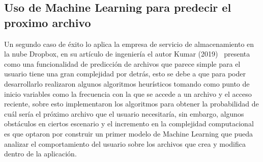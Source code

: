 \documentclass[9pt,a4paper,twoside]{rho-class/rho}
\begin{document}
        \subsection{Uso de Machine Learning para predecir el proximo archivo}
        Un segundo caso de éxito lo aplica la empresa de servicio de almacenamiento en la nube Dropbox, en su artículo de ingeniería el autor Kumar (2019)~\cite{PredictFile} presenta como una funcionalidad de predicción de archivos que parece simple para el usuario tiene una gran complejidad por detrás, esto se debe a que para poder desarrollarlo realizaron algunos algoritmos heurísticos tomando como punto de inicio variables como la frecuencia con la que se accede a un archivo y el acceso reciente, sobre esto implementaron los algoritmos para obtener la probabilidad de cuál sería el próximo archivo que el usuario necesitaría, sin embargo, algunos obstáculos en ciertos escenario y el incremento en la complejidad computacional es que optaron por construir un primer modelo de Machine Learning que pueda analizar el comportamiento del usuario sobre los archivos que crea y modifica dentro de la aplicación.

\end{document}
